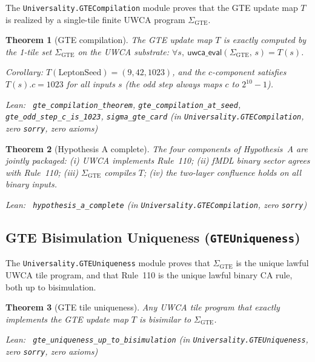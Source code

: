 \documentclass[11pt,a4paper]{article}
\newenvironment{leanref}%
  {\par\smallskip\noindent\begingroup\raggedright\textup{Lean:}~}%
  {\par\endgroup}
\newtheorem{theorem}{Theorem}[section]
\theoremstyle{definition}
\begin{document}
The \texttt{Universality.GTECompilation} module proves that the GTE update map
$T$ is realized by a single-tile finite UWCA program $\Sigma_{\mathrm{GTE}}$.

\begin{theorem}[GTE compilation]\label{thm:gte-compilation}
The GTE update map $T$ is exactly computed by the 1-tile set $\Sigma_{\mathrm{GTE}}$
on the UWCA substrate:
$\forall s,\ \mathsf{uwca\_eval}(\Sigma_{\mathrm{GTE}},\, s) = T(s)$.

Corollary: $T(\text{LeptonSeed}) = (9,42,1023)$,
and the $c$-component satisfies $T(s).c = 1023$ for \emph{all} inputs $s$
(the odd step always maps $c$ to $2^{10}-1$).

\begin{leanref}
\lstinline|gte_compilation_theorem|,
\lstinline|gte_compilation_at_seed|,
\lstinline|gte_odd_step_c_is_1023|,
\lstinline|sigma_gte_card|
\textup{(in \texttt{Universality.GTECompilation}, zero \texttt{sorry}, zero axioms)}
\end{leanref}
\end{theorem}

\begin{theorem}[Hypothesis A complete]\label{thm:hypothesis-a-complete}
The four components of Hypothesis~A are jointly packaged: (i) UWCA implements Rule~110;
(ii) fMDL binary sector agrees with Rule~110; (iii) $\Sigma_{\mathrm{GTE}}$ compiles $T$;
(iv) the two-layer confluence holds on all binary inputs.

\begin{leanref}
\lstinline|hypothesis_a_complete|
\textup{(in \texttt{Universality.GTECompilation}, zero \texttt{sorry})}
\end{leanref}
\end{theorem}

\subsection{GTE Bisimulation Uniqueness (\texttt{GTEUniqueness})}\label{subsec:gte-uniqueness}

The \texttt{Universality.GTEUniqueness} module proves that $\Sigma_{\mathrm{GTE}}$ is the
unique lawful UWCA tile program, and that Rule~110 is the unique lawful binary CA rule,
both up to bisimulation.

\begin{theorem}[GTE tile uniqueness]\label{thm:gte-tile-unique}
Any UWCA tile program that exactly implements the GTE update map $T$ is bisimilar to
$\Sigma_{\mathrm{GTE}}$.

\begin{leanref}
\lstinline|gte_uniqueness_up_to_bisimulation|
\textup{(in \texttt{Universality.GTEUniqueness}, zero \texttt{sorry}, zero axioms)}
\end{leanref}
\end{theorem}
\end{document}
